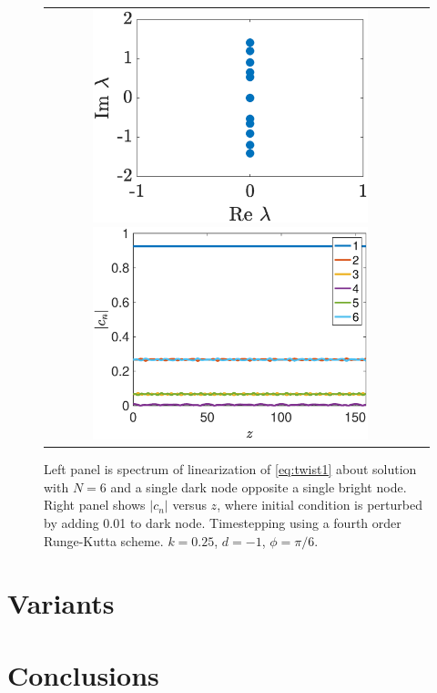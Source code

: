 \documentclass[12pt]{article}
\begin{document}
\begin{figure}[H]
\begin{center}
\begin{tabular}{cc}
\includegraphics[width=8cm]{images/evenhole6spec.eps}
\includegraphics[width=8cm]{images/evenhole6perturbed.eps}
\end{tabular}
\end{center}
\caption{Left panel is spectrum of linearization of \cref{eq:twist1} about solution with $N=6$ and a single dark node opposite a single bright node. Right panel shows $|c_n|$ versus $z$, where initial condition is perturbed by adding 0.01 to dark node. Timestepping using a fourth order Runge-Kutta scheme. $k=0.25$, $d=-1$, $\phi=\pi/6$.}
\label{fig:evenhole6perturbed}
\end{figure}

\section{Variants}

\section{Conclusions}



\end{document}
